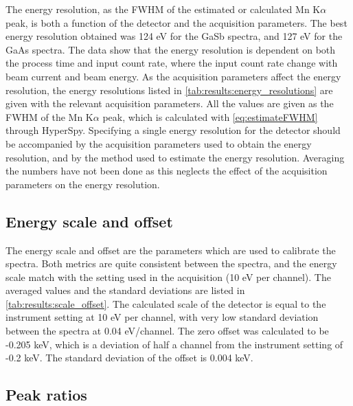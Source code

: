 The energy resolution, as the FWHM of the estimated or calculated Mn K$\alpha$ peak, is both a function of the detector and the acquisition parameters.
The best energy resolution obtained was 124 eV for the GaSb spectra, and 127 eV for the GaAs spectra.
The data show that the energy resolution is dependent on both the process time and input count rate, where the input count rate change with beam current and beam energy.
As the acquisition parameters affect the energy resolution, the energy resolutions listed in \cref{tab:results:energy_resolutions} are given with the relevant acquisition parameters.
All the values are given as the FWHM of the Mn K$\alpha$ peak, which is calculated with \cref{eq:estimateFWHM} through HyperSpy.
Specifying a single energy resolution for the detector should be accompanied by the acquisition parameters used to obtain the energy resolution, and by the method used to estimate the energy resolution.
Averaging the numbers have not been done as this neglects the effect of the acquisition parameters on the energy resolution.





\subsection*{Energy scale and offset}
\label{results:setup:scale_offset}

The energy scale and offset are the parameters which are used to calibrate the spectra.
Both metrics are quite consistent between the spectra, and the energy scale match with the setting used in the acquisition (10 eV per channel).
The averaged values and the standard deviations are listed in \cref{tab:results:scale_offset}.
The calculated scale of the detector is equal to the instrument setting at 10 eV per channel, with very low standard deviation between the spectra at 0.04 eV/channel.
The zero offset was calculated to be -0.205 keV, which is a deviation of half a channel from the instrument setting of -0.2 keV.
The standard deviation of the offset is 0.004 keV.






\subsection*{Peak ratios}
\label{results:setup:peak_ratios}

